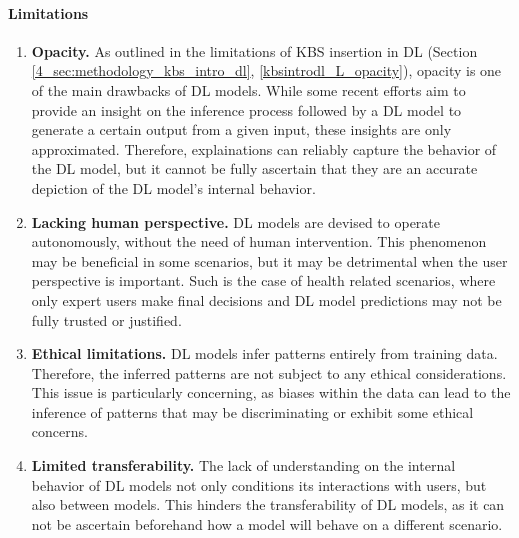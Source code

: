 \paragraph{Limitations}
\begin{enumerate} [start=1,label={\bfseries L\arabic*.}]
    \item \textbf{Opacity.} \label{kbsextradl_L_opacity} As outlined in the limitations of KBS insertion in DL (Section \ref{4_sec:methodology_kbs_intro_dl}, \ref{kbsintrodl_L_opacity}), opacity is one of the main drawbacks of DL models. While some recent efforts aim to provide an insight on the inference process followed by a DL model to generate a certain output from a given input, these insights are only approximated. Therefore, explainations can reliably capture the behavior of the DL model, but it cannot be fully ascertain that they are an accurate depiction of the DL model's internal behavior.

    \item \textbf{Lacking human perspective.} \label{kbsextradl_L_human} DL models are devised to operate autonomously, without the need of human intervention. This phenomenon may be beneficial in some scenarios, but it may be detrimental when the user perspective is important. Such is the case of health related scenarios, where only expert users make final decisions and DL model predictions may not be fully trusted or justified. 
    
    \item \textbf{Ethical limitations.} \label{kbsextradl_L_ethical} DL models infer patterns entirely from training data. Therefore, the inferred patterns are not subject to any ethical considerations. This issue is particularly concerning, as biases within the data can lead to the inference of patterns that may be discriminating or exhibit some ethical concerns.
    
    \item \textbf{Limited transferability.}\label{kbsextradl_L_transferability} The lack of understanding on the internal behavior of DL models not only conditions its interactions with users, but also between models. This hinders the transferability of DL models, as it can not be ascertain beforehand how a model will behave on a different scenario.
\end{enumerate}

